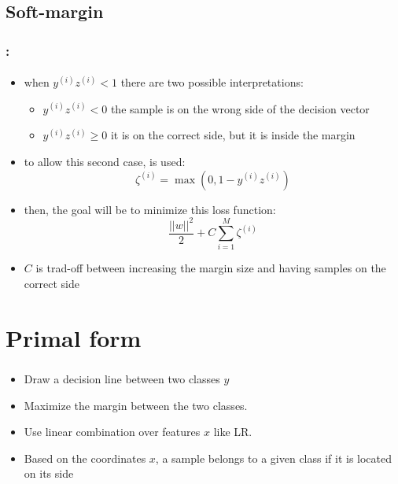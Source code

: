 \documentclass[xcolor=table]{beamer}
\begin{document}
\subsection{Soft-margin}

\begin{frame}
	\frametitle{\insertshortsubtitle: \insertsection}
	\framesubtitle{\insertsubsection}
	
	\begin{itemize}
		\item when $y^{(i)} z^{(i)} < 1 $ there are two possible interpretations:
		\begin{itemize}
			\item $y^{(i)} z^{(i)} < 0 $ the sample is on the wrong side of the decision vector
			\item $y^{(i)} z^{(i)} \ge 0 $ it is on the correct side, but it is inside the margin 
		\end{itemize}
		\item to allow this second case,  is used:
		\[\zeta^{(i)} = \max (0, 1 - y^{(i)} z^{(i)})\]
		\item then, the goal will be to minimize this loss function:
		\[ \frac{||w||^2}{2}  + C \sum_{i=1}^{M} \zeta^{(i)} \]
		\item $ C $ is trad-off between increasing the margin size and having samples on the correct side
	\end{itemize}
	
\end{frame}


\section{Primal form}

\begin{frame}
	\frametitle{\insertshortsubtitle}
	\framesubtitle{\insertsection}
	
	\begin{minipage}{0.70\textwidth} 
		\begin{itemize}
			\item Draw a decision line between two classes $ y $ 
			\item Maximize the margin between the two classes.
			\item Use linear combination over features $ x $ like LR. 
			\item Based on the coordinates $ x $, a sample belongs to a given class if it is located on its side
		\end{itemize}
	\end{minipage}
	\begin{minipage}{0.29\textwidth} 
	\end{minipage}
	

\end{frame}
\end{document}
